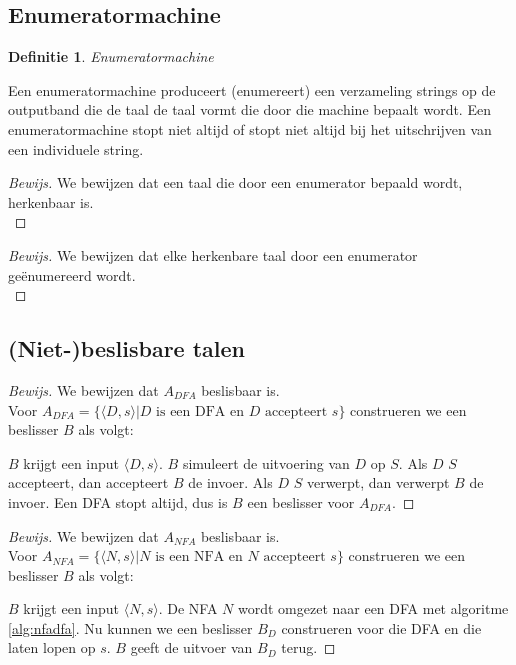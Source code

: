 \documentclass[a4paper]{article}
\newtheorem{tdefinitie}{Definitie}[section]
\newenvironment{definitie}[1]%
  {\begin{mdframed}[backgroundcolor=silver,
    topline=false,
    rightline=false,
    leftline=false,
    bottomline=false]\begin{tdefinitie}#1\\\normalfont}%
  {\end{tdefinitie}\end{mdframed}}
\newenvironment{bewijs}[1]%
  {\begin{mdframed}[topline=true,
    rightline=true,
    leftline=true,
    bottomline=true]\begin{proof}[Bewijs]#1\\[.2cm]\normalfont}%
  {\end{proof}\end{mdframed}}
\begin{document}
\subsection{Enumeratormachine}

\begin{definitie}{Enumeratormachine}
  
\end{definitie}

Een enumeratormachine produceert (enumereert) een verzameling strings op de outputband die de taal de taal vormt die door die machine bepaalt wordt. Een enumeratormachine stopt niet altijd of stopt niet altijd bij het uitschrijven van een individuele string.

\begin{bewijs}{We bewijzen dat een taal die door een enumerator bepaald wordt, herkenbaar is.}
  
\end{bewijs}

\begin{bewijs}{We bewijzen dat elke herkenbare taal door een enumerator\\ge\"enumereerd wordt.}
  
\end{bewijs}

\subsection{(Niet-)beslisbare talen}

\begin{bewijs}{We bewijzen dat $A_{DFA}$ beslisbaar is.}
  Voor $A_{DFA} = \{\langle D,s \rangle | D \text{ is een DFA en } D \text{ accepteert } s\}$ construeren we een beslisser $B$ als volgt:
 
  $B$ krijgt een input $\langle D,s \rangle$. $B$ simuleert de uitvoering van $D$ op $S$. Als $D$ $S$ accepteert, dan accepteert $B$ de invoer. Als $D$ $S$ verwerpt, dan verwerpt $B$ de invoer. Een DFA stopt altijd, dus is $B$ een beslisser voor $A_{DFA}$.
\end{bewijs}

\begin{bewijs}{We bewijzen dat $A_{NFA}$ beslisbaar is.}
  Voor $A_{NFA} = \{\langle N,s \rangle | N \text{ is een NFA en } N \text{ accepteert } s\}$ construeren we een beslisser $B$ als volgt:
 
 $B$ krijgt een input $\langle N,s \rangle$. De NFA $N$ wordt omgezet naar een DFA met algoritme \ref{alg:nfadfa}. Nu kunnen we een beslisser $B_D$ construeren voor die DFA en die laten lopen op $s$. $B$ geeft de uitvoer van $B_D$ terug.
\end{bewijs}
\end{document}
